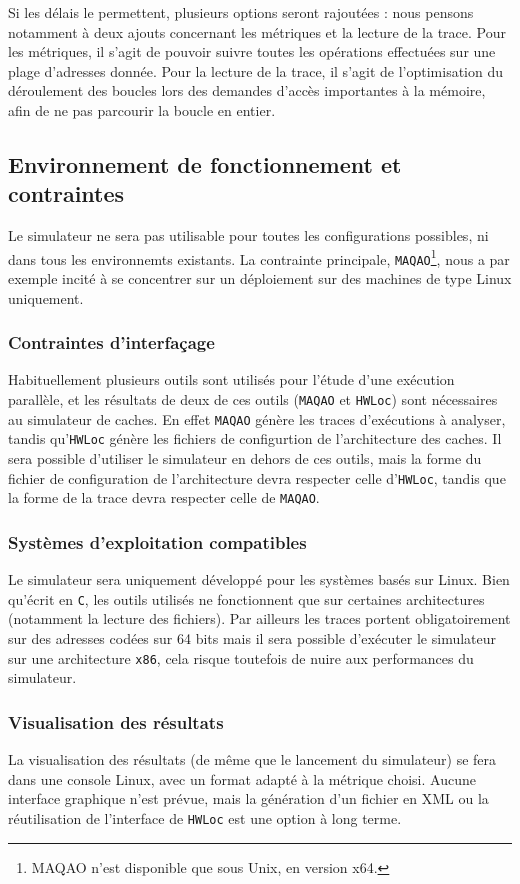 Si les délais le permettent, plusieurs options seront rajoutées : nous pensons notamment à deux ajouts concernant les métriques et la lecture de la trace. Pour les métriques, il s'agit de pouvoir suivre toutes les opérations effectuées sur une plage d'adresses donnée. Pour la lecture de la trace, il s'agit de l'optimisation du déroulement des boucles lors des demandes d'accès importantes à la mémoire, afin de ne pas parcourir la boucle en entier.

\subsection{Environnement de fonctionnement et contraintes}

Le simulateur ne sera pas utilisable pour toutes les configurations possibles, ni dans tous les environnemts existants. La contrainte principale, \texttt{MAQAO}\footnote{MAQAO n'est disponible que sous Unix, en version x64.}, nous a par exemple incité à se concentrer sur un déploiement sur des machines de type Linux uniquement. 

\subsubsection{Contraintes d'interfaçage}

Habituellement plusieurs outils sont utilisés pour l'étude d'une exécution parallèle, et les résultats de deux de ces outils (\texttt{MAQAO} et \texttt{HWLoc}) sont nécessaires au simulateur de caches. En effet \texttt{MAQAO} génère les traces d'exécutions à analyser, tandis qu'\texttt{HWLoc}
génère les fichiers de configurtion de l'architecture des caches. Il sera possible d'utiliser le simulateur en dehors de ces outils, mais la forme du fichier de configuration de l'architecture devra respecter celle d'\texttt{HWLoc}, tandis que la forme de la trace devra respecter celle de \texttt{MAQAO}.

\subsubsection{Systèmes d'exploitation compatibles}

Le simulateur sera uniquement développé pour les systèmes basés sur Linux. Bien qu'écrit en \texttt{C}, les outils utilisés ne fonctionnent que sur certaines architectures (notamment la lecture des fichiers). Par ailleurs les traces portent obligatoirement sur des adresses codées sur 64 bits mais il sera possible d'exécuter le simulateur sur une architecture \verb!x86!, cela risque toutefois de nuire aux performances du simulateur.

\subsubsection{Visualisation des résultats}

La visualisation des résultats (de même que le lancement du simulateur) se fera dans une console Linux, avec un format adapté à la métrique choisi. Aucune interface graphique n'est prévue, mais la génération d'un fichier en XML ou la réutilisation de l'interface de \texttt{HWLoc} est une option à long terme.
